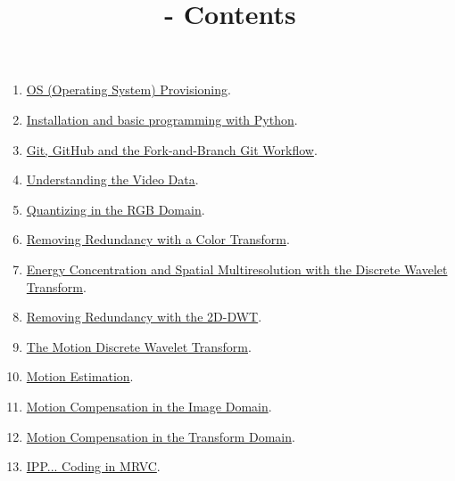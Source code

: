 
\title{\SM - Contents}

\maketitle

\begin{enumerate}
\item \href{https://sistemas-multimedia.github.io/milestones/01-provisioning/}{OS (Operating System) Provisioning}.
\item \href{https://sistemas-multimedia.github.io/milestones/02-python/}{Installation and basic programming with Python}.
\item \href{https://sistemas-multimedia.github.io/milestones/03-git/}{Git, GitHub and the Fork-and-Branch Git Workflow}.
\item \href{https://sistemas-multimedia.github.io/milestones/04-the_data/}{Understanding the Video Data}.
\item \href{https://sistemas-multimedia.github.io/milestones/05-quantization/}{Quantizing in the RGB Domain}.
\item \href{https://sistemas-multimedia.github.io/milestones/06-color_transform/}{Removing Redundancy with a Color Transform}.
\item \href{https://sistemas-multimedia.github.io/milestones/07-DWT/}{Energy Concentration and Spatial Multiresolution with the Discrete Wavelet Transform}.
\item \href{https://sistemas-multimedia.github.io/milestones/08-2D-DWT/}{Removing Redundancy with the 2D-DWT}.
\item \href{https://sistemas-multimedia.github.io/milestones/09-MDWT/}{The Motion Discrete Wavelet Transform}.
\item \href{https://sistemas-multimedia.github.io/milestones/10-ME/}{Motion Estimation}.
\item \href{https://sistemas-multimedia.github.io/milestones/11-MC_in_image_domain/}{Motion Compensation in the Image Domain}.
\item \href{https://sistemas-multimedia.github.io/milestones/12-MC_in_transform_domain/}{Motion Compensation in the Transform Domain}.
\item \href{https://sistemas-multimedia.github.io/milestones/13-IPP_coding/}{IPP... Coding in MRVC}.

\end{enumerate}
